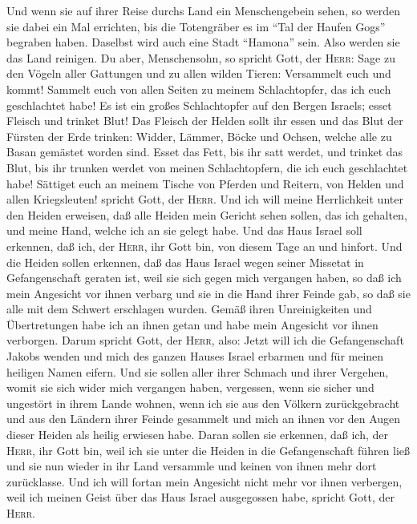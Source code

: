  Und wenn sie auf ihrer Reise durchs Land ein
Menschengebein sehen, so werden sie dabei ein Mal errichten, bis die
Totengräber es im ``Tal der Haufen Gogs'' begraben haben.
 Daselbst wird auch eine Stadt ``Hamona'' sein. Also
werden sie das Land reinigen.  Du aber, Menschensohn, so
spricht Gott, der \textsc{Herr}: Sage zu den Vögeln aller Gattungen und
zu allen wilden Tieren: Versammelt euch und kommt! Sammelt euch von
allen Seiten zu meinem Schlachtopfer, das ich euch geschlachtet habe! Es
ist ein großes Schlachtopfer auf den Bergen Israels; esset Fleisch und
trinket Blut!  Das Fleisch der Helden sollt ihr essen und
das Blut der Fürsten der Erde trinken: Widder, Lämmer, Böcke und Ochsen,
welche alle zu Basan gemästet worden sind.  Esset das
Fett, bis ihr satt werdet, und trinket das Blut, bis ihr trunken werdet
von meinen Schlachtopfern, die ich euch geschlachtet habe!
 Sättiget euch an meinem Tische von Pferden und Reitern,
von Helden und allen Kriegsleuten! spricht Gott, der \textsc{Herr}.
 Und ich will meine Herrlichkeit unter den Heiden
erweisen, daß alle Heiden mein Gericht sehen sollen, das ich gehalten,
und meine Hand, welche ich an sie gelegt habe.  Und das
Haus Israel soll erkennen, daß ich, der \textsc{Herr}, ihr Gott bin, von
diesem Tage an und hinfort.  Und die Heiden sollen
erkennen, daß das Haus Israel wegen seiner Missetat in Gefangenschaft
geraten ist, weil sie sich gegen mich vergangen haben, so daß ich mein
Angesicht vor ihnen verbarg und sie in die Hand ihrer Feinde gab, so daß
sie alle mit dem Schwert erschlagen wurden.  Gemäß ihren
Unreinigkeiten und Übertretungen habe ich an ihnen getan und habe mein
Angesicht vor ihnen verborgen.  Darum spricht Gott, der
\textsc{Herr}, also: Jetzt will ich die Gefangenschaft Jakobs wenden und
mich des ganzen Hauses Israel erbarmen und für meinen heiligen Namen
eifern.  Und sie sollen aller ihrer Schmach und ihrer
Vergehen, womit sie sich wider mich vergangen haben, vergessen, wenn sie
sicher und ungestört in ihrem Lande wohnen,  wenn ich sie
aus den Völkern zurückgebracht und aus den Ländern ihrer Feinde
gesammelt und mich an ihnen vor den Augen dieser Heiden als heilig
erwiesen habe.  Daran sollen sie erkennen, daß ich, der
\textsc{Herr}, ihr Gott bin, weil ich sie unter die Heiden in die
Gefangenschaft führen ließ und sie nun wieder in ihr Land versammle und
keinen von ihnen mehr dort zurücklasse.  Und ich will
fortan mein Angesicht nicht mehr vor ihnen verbergen, weil ich meinen
Geist über das Haus Israel ausgegossen habe, spricht Gott, der
\textsc{Herr}.

